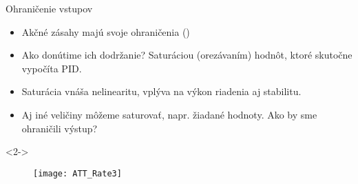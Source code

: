 \begin{frame}[t]{Ohraničenie vstupov}
  \begin{itemize}
    \item<1-> Akčné zásahy majú svoje ohraničenia ()
    \item<2-> Ako donútime ich dodržanie? Saturáciou (orezávaním) hodnôt, ktoré skutočne vypočíta PID.
    \item<3-> Saturácia vnáša nelinearitu, vplýva na výkon riadenia aj stabilitu.
    \item<4-> Aj iné veličiny môžeme saturovať, napr. žiadané hodnoty. Ako by sme ohraničili výstup?
  \end{itemize}

    \begin{onlyenv}<2->
  \begin{figure}
\centering
  \texttt{[image: ATT\_Rate3]}\\
\end{figure}
\end{onlyenv}
\end{frame}


